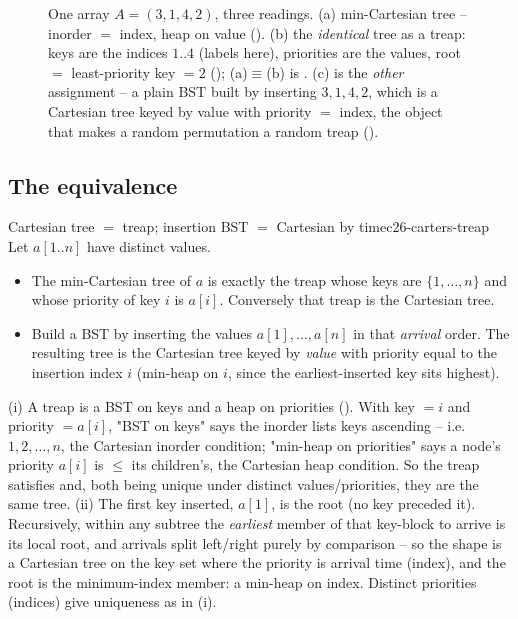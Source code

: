 \begin{figure}[H]
\caption{One array $A=(3,1,4,2)$, three readings. (a) min-Cartesian tree -- inorder $=$ index, heap on
value (). (b) the \emph{identical} tree as a treap: keys are the indices $1..4$
(labels here), priorities are the values, root $=$ least-priority key $=2$ ();
(a)$\equiv$(b) is . (c) is the \emph{other} assignment -- a plain BST built by
inserting $3,1,4,2$, which is a Cartesian tree keyed by value with priority $=$ index, the object that
makes a random permutation a random treap ().}\label{fig:c26-iso}
\end{figure}

\subsection{The equivalence}

\begin{proposition}{Cartesian tree $=$ treap; insertion BST $=$ Cartesian by time}{c26-carters-treap}
Let $a[1..n]$ have distinct values.
\begin{itemize}[nosep]
  \item[(i)] The min-Cartesian tree of $a$ is exactly the treap whose keys are $\{1,\dots,n\}$ and whose
        priority of key $i$ is $a[i]$. Conversely that treap is the Cartesian tree.
  \item[(ii)] Build a BST by inserting the values $a[1],\dots,a[n]$ in that \emph{arrival} order. The
        resulting tree is the Cartesian tree keyed by \emph{value} with priority equal to the insertion
        index $i$ (min-heap on $i$, since the earliest-inserted key sits highest).
\end{itemize}
\end{proposition}
\begin{proofbox}
(i) A treap is a BST on keys and a heap on priorities (). With key $=i$ and priority
$=a[i]$, "BST on keys" says the inorder lists keys ascending -- i.e.\ $1,2,\dots,n$, the Cartesian
inorder condition; "min-heap on priorities" says a node's priority $a[i]$ is $\le$ its children's, the
Cartesian heap condition. So the treap satisfies  and, both being unique under
distinct values/priorities, they are the same tree. (ii) The first key inserted, $a[1]$, is the root (no
key preceded it). Recursively, within any subtree the \emph{earliest} member of that key-block to arrive is
its local root, and arrivals split left/right purely by comparison -- so the shape is a Cartesian tree on
the key set where the priority is arrival time (index), and the root is the minimum-index member: a
min-heap on index. Distinct priorities (indices) give uniqueness as in (i). \end{proofbox}


